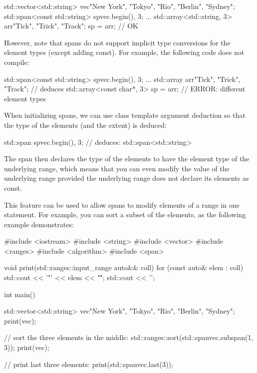 \begin{cpp}
std::vector<std::string> vec{"New York", "Tokyo", "Rio", "Berlin", "Sydney"};
std::span<const std::string> sp{vec.begin(), 3};
...
std::array<std::string, 3> arr{"Tick", "Trick", "Track"};
sp = arr; // OK
\end{cpp}

However, note that spans do not support implicit type conversions for the element types (except adding const). For example, the following code does not compile:

\begin{cpp}
std::span<const std::string> sp{vec.begin(), 3};
...
std::array arr{"Tick", "Trick", "Track"}; // deduces std::array<const char*, 3>
sp = arr; // ERROR: different element types
\end{cpp}


When initializing spans, we can use class template argument deduction so that the type of the elements (and the extent) is deduced:

\begin{cpp}
std::span sp{vec.begin(), 3}; // deduces: std::span<std::string>
\end{cpp}

The span then declares the type of the elements to have the element type of the underlying range, which means that you can even modify the value of the underlying range provided the underlying range does not declare its elements as const.

This feature can be used to allow spans to modify elements of a range in one statement. For example, you can sort a subset of the elements, as the following example demonstrates:


\begin{cpp}
#include <iostream>
#include <string>
#include <vector>
#include <ranges>
#include <algorithm>
#include <span>

void print(std::ranges::input_range auto&& coll)
{
	for (const auto& elem : coll) {
		std::cout << '"' << elem << "\" ";
	}
	std::cout << '\n';
}

int main()
{
	std::vector<std::string> vec{"New York", "Tokyo", "Rio", "Berlin", "Sydney"};
	print(vec);
	
	// sort the three elements in the middle:
	std::ranges::sort(std::span{vec}.subspan(1, 3));
	print(vec);
	
	// print last three elements:
	print(std::span{vec}.last(3));
}
\end{cpp}

